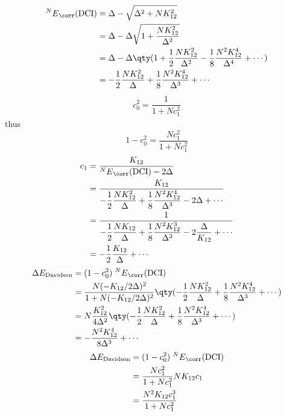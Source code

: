 \documentclass[a4paper]{article}
\begin{document}
\begin{align}
{^N E}_{\corr}(\text{DCI}) &= \Delta - \sqrt{\Delta^2 + N K_{12}^2} \notag\\
&= \Delta - \Delta\sqrt{1 + \dfrac{N K_{12}^2}{\Delta^2}} \notag\\
&= \Delta - \Delta\qty(1 + \dfrac{1}{2}\dfrac{N K_{12}^2}{\Delta^2} - \dfrac{1}{8}\dfrac{N^2 K_{12}^4}{\Delta^4} + \cdots) \notag\\
&= -\dfrac{1}{2}\dfrac{N K_{12}^2}{\Delta} + \dfrac{1}{8}\dfrac{N^2 K_{12}^4}{\Delta^3} + \cdots
\end{align}
\begin{align}
c_0^2 = \dfrac{1}{1 + N c_1^2}
\end{align}
thus
\begin{equation}\label{key}
1 - c_0^2 = \dfrac{N c_1^2}{1 + N c_1^2}
\end{equation}
\begin{align}
c_1 &= \dfrac{K_{12}}{{^N E}_{\corr}(\text{DCI}) - 2\Delta} \notag\\
&= \dfrac{K_{12}}{-\dfrac{1}{2}\dfrac{N K_{12}^2}{\Delta} + \dfrac{1}{8}\dfrac{N^2 K_{12}^4}{\Delta^3} - 2\Delta + \cdots} \notag\\
&= \dfrac{1}{-\dfrac{1}{2}\dfrac{N K_{12}}{\Delta} + \dfrac{1}{8}\dfrac{N^2 K_{12}^3}{\Delta^3} - 2\dfrac{\Delta}{K_{12}} + \cdots} \notag\\
&= -\dfrac{1}{2}\dfrac{K_{12}}{\Delta} + \cdots
\end{align}
\begin{align}
\Delta E_{\text{Davidson}} &= (1 - c_0^2) \; {^N E}_{\corr}(\text{DCI}) \\
&= \dfrac{N (-K_{12}/2\Delta)^2}{1 + N (-K_{12}/2\Delta)^2} \qty(-\dfrac{1}{2}\dfrac{N K_{12}^2}{\Delta} + \dfrac{1}{8}\dfrac{N^2 K_{12}^4}{\Delta^3} + \cdots) \notag\\
&= N \dfrac{K_{12}^2}{4\Delta^2} \qty(-\dfrac{1}{2}\dfrac{N K_{12}^2}{\Delta} + \dfrac{1}{8}\dfrac{N^2 K_{12}^4}{\Delta^3} + \cdots) \notag\\
&= -\dfrac{N^2 K_{12}^4}{8\Delta^3} +\cdots
\end{align}
\begin{align}
\Delta E_{\text{Davidson}} &= (1 - c_0^2) \; {^N E}_{\corr}(\text{DCI}) \notag\\
&= \dfrac{N c_1^2}{1 + N c_1^2} NK_{12}c_1 \notag\\
&= \dfrac{N^2 K_{12} c_1^3}{1 + N c_1^2}
\end{align}
\end{document}
